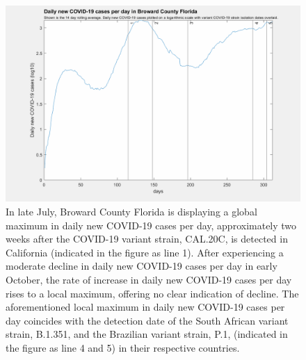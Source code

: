 \documentclass[]{article}
\begin{document}
\begin{figure}[!h]
	\includegraphics[width=\linewidth]{images/broward_cases_strains_log.png}
	\caption{In late July, Broward County Florida is displaying a global maximum in daily new COVID-19 cases per day, approximately two weeks after the COVID-19 variant strain, CAL.20C, is detected in California (indicated in the figure as line 1). After experiencing a moderate decline in daily new COVID-19 cases per day in early October, the rate of increase in daily new COVID-19 cases per day rises to a local maximum, offering no clear indication of decline. The aforementioned local maximum in daily new COVID-19 cases per day coincides with the detection date of the South African variant strain, B.1.351, and the Brazilian variant strain, P.1, (indicated in the figure as line 4 and 5) in their respective countries. }
	\label{fig:images/broward_cases_strains_logLabel}
\end{figure}
\end{document}
